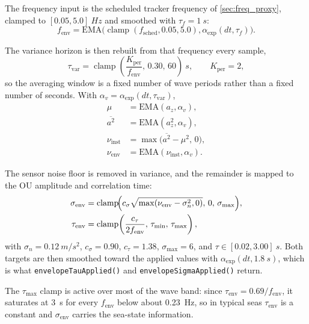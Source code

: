 \documentclass[conference]{IEEEtran}
\DeclareMathOperator{\clamp}{clamp}
\begin{document}
    The frequency input is the scheduled tracker frequency of
    \cref{sec:freq_proxy}, clamped to \([0.05,5.0]~\si{Hz}\) and smoothed with
    \(\tau_f = \SI{1}{s}\):
    \begin{equation}
        f_{\mathrm{env}} = \mathrm{EMA}\bigl(\clamp(f_{\mathrm{sched}},0.05,5.0),
        \alpha_{\exp}(dt,\tau_f)\bigr).
    \end{equation}

    The variance horizon is then rebuilt from that frequency every sample,
    \begin{equation}
        \tau_{\mathrm{var}} =
        \clamp\!\left(\frac{K_{\mathrm{per}}}{f_{\mathrm{env}}},\,0.30,\,60\right)~\si{s},
        \qquad K_{\mathrm{per}} = 2,
    \end{equation}
    so the averaging window is a fixed number of wave periods rather than a
    fixed number of seconds. With \(\alpha_v=\alpha_{\exp}(dt,\tau_{\mathrm{var}})\),
    \begin{align}
        \mu &= \mathrm{EMA}(a_z,\alpha_v),\\
        \overline{a^2} &= \mathrm{EMA}(a_z^2,\alpha_v),\\
        \nu_{\mathrm{inst}} &= \max\bigl(\overline{a^2}-\mu^2,\,0\bigr),\\
        \nu_{\mathrm{env}} &= \mathrm{EMA}(\nu_{\mathrm{inst}},\alpha_v).
    \end{align}

    The sensor noise floor is removed in variance, and the remainder is mapped
    to the OU amplitude and correlation time:
    \begin{align}
        \sigma_{\mathrm{env}} &=
        \clamp\!\Bigl(c_\sigma\sqrt{\max(\nu_{\mathrm{env}}-\sigma_n^2,0)},\,
        0,\,\sigma_{\max}\Bigr),\\
        \tau_{\mathrm{env}} &=
        \clamp\!\left(\frac{c_\tau}{2 f_{\mathrm{env}}},\,
        \tau_{\min},\,\tau_{\max}\right),
    \end{align}
    with \(\sigma_n=\SI{0.12}{m/s^2}\), \(c_\sigma=0.90\), \(c_\tau=1.38\),
    \(\sigma_{\max}=6\), and \(\tau\in[0.02,3.00]~\si{s}\).
    Both targets are then smoothed toward the applied values with
    \(\alpha_{\exp}(dt,\SI{1.8}{s})\), which is what
    \texttt{envelopeTauApplied()} and \texttt{envelopeSigmaApplied()} return.

    The \(\tau_{\max}\) clamp is active over most of the wave band: since
    \(\tau_{\mathrm{env}}=0.69/f_{\mathrm{env}}\), it saturates at \SI{3}{s} for
    every \(f_{\mathrm{env}}\) below about \SI{0.23}{Hz}, so in typical seas
    \(\tau_{\mathrm{env}}\) is a constant and \(\sigma_{\mathrm{env}}\) carries
    the sea-state information.
\end{document}
